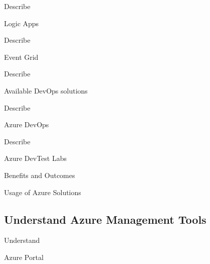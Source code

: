 \documentclass{scrartcl}
\newenvironment{flashcard}[2][]{%
    #1
    \vfill
    \centerline{\Large{#2}}
    \vfill
    \newpage
}
{\newpage}
\newcommand{\subsectioncard}[1]{
    \vspace*{\stretch{1}}
    \subsection{#1}
    \vspace*{\stretch{1}}
    \pagebreak
}
\begin{document}
    \begin{flashcard}[Describe]{Logic Apps}

    \end{flashcard}

    \begin{flashcard}[Describe]{Event Grid}

    \end{flashcard}

    \begin{flashcard}[Describe]{Available DevOps solutions}

    \end{flashcard}

    \begin{flashcard}[Describe]{Azure DevOps}

    \end{flashcard}

    \begin{flashcard}[Describe]{Azure DevTest Labs}

    \end{flashcard}

    \begin{flashcard}[Benefits and Outcomes]{Usage of Azure Solutions}

    \end{flashcard}

    \subsectioncard{Understand Azure Management Tools}

    \begin{flashcard}[Understand]{Azure Portal}

    \end{flashcard}
\end{document}
